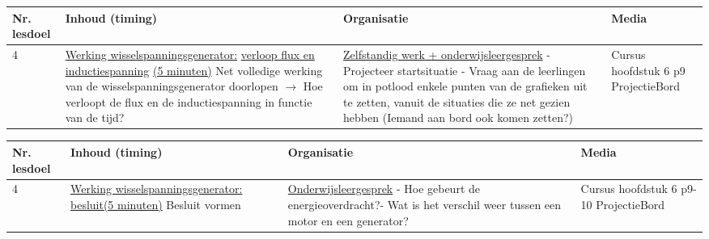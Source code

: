 \begin{landscape}
\begin{tabularx}{1.56\textwidth}{|p{1.5cm}|p{8cm}|X|p{4cm}|}
	\hline
	\textbf{Nr. lesdoel } & \textbf{Inhoud (timing)}  & \textbf{Organisatie } & \textbf{Media } \\ \hline
	4& \underline{Werking wisselspanningsgenerator:} \underline{verloop flux en inductiespanning} \underline{(5 minuten)}\newline
	Net volledige werking van de wisselspanningsgenerator doorlopen $\rightarrow$  Hoe verloopt de flux  en de inductiespanning in functie van de tijd?
	&  \underline{Zelfstandig werk + onderwijsleergesprek}\newline  
	- Projecteer startsituatie \newline
	- Vraag aan de leerlingen om in potlood enkele punten van de grafieken uit te zetten, vanuit de situaties die ze net gezien hebben (Iemand aan bord ook komen zetten?)\newline
	&  Cursus hoofdstuk 6 p9 \newline\newline Projectie\newline\newline Bord
	\\ \hline
\end{tabularx}\vspace{5mm}



\begin{tabularx}{1.56\textwidth}{|p{1.5cm}|p{8cm}|X|p{4cm}|}
	\hline
	\textbf{Nr. lesdoel } & \textbf{Inhoud (timing)}  & \textbf{Organisatie } & \textbf{Media } \\ \hline
	4& \underline{Werking wisselspanningsgenerator:} \underline{besluit(5 minuten)}\newline 
	Besluit vormen 
	&  \underline{Onderwijsleergesprek}\newline  
	- Hoe gebeurt de energieoverdracht?\newline - Wat is het verschil weer tussen een motor en een generator?
	&  Cursus hoofdstuk 6 p9-10 \newline\newline Projectie\newline\newline Bord
	\\ \hline
\end{tabularx}\vspace{5mm}

	
\end{landscape}

